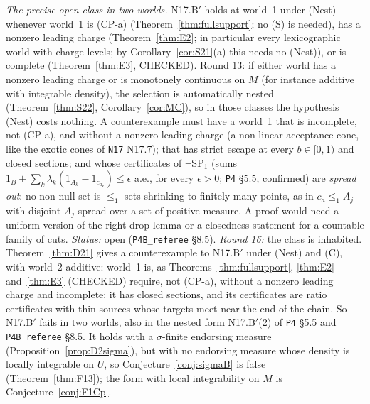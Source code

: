 \documentclass[11pt]{article}
\theoremstyle{definition}
\theoremstyle{remark}
\newcommand{\src}[1]{\texttt{#1}}
\begin{document}
\emph{The precise open class in two worlds.} N17.B$'$ holds at world~1 under (Nest) whenever world~1 is (CP-a) (Theorem~\ref{thm:fullsupport}; no (S) is needed), has a nonzero leading charge (Theorem~\ref{thm:E2}; in particular every lexicographic world with charge levels; by Corollary~\ref{cor:S21}(a) this needs no (Nest)), or is complete (Theorem~\ref{thm:E3}, CHECKED). Round 13: if either world has a nonzero leading charge or is monotonely continuous on $M$ (for instance additive with integrable density), the selection is automatically nested (Theorem~\ref{thm:S22}, Corollary~\ref{cor:MC}), so in those classes the hypothesis (Nest) costs nothing. A counterexample must have a world~1 that is incomplete, not (CP-a), and without a nonzero leading charge (a non-linear acceptance cone, like the exotic cones of \src{N17} N17.7); that has strict escape at every $b\in[0,1)$ and closed sections; and whose certificates of $\neg$SP$_1$ (sums $1_B+\sum_k\lambda_k(1_{A_k}-1_{c_{a_k}})\le\epsilon$ a.e., for every $\epsilon>0$; \src{P4} \S5.5, confirmed) are \emph{spread out}: no non-null set is $\le_1$ sets shrinking to finitely many points, as in $c_a\le_1A_j$ with disjoint $A_j$ spread over a set of positive measure. A proof would need a uniform version of the right-drop lemma or a closedness statement for a countable family of cuts. \emph{Status:} open (\src{P4B\_referee} \S8.5). \emph{Round 16:} the class is inhabited. Theorem~\ref{thm:D21} gives a counterexample to N17.B$'$ under (Nest) and (C), with world~2 additive: world~1 is, as Theorems~\ref{thm:fullsupport}, \ref{thm:E2} and~\ref{thm:E3} (CHECKED) require, not (CP-a), without a nonzero leading charge and incomplete; it has closed sections, and its certificates are ratio certificates with thin sources whose targets meet near the end of the chain. So N17.B$'$ fails in two worlds, also in the nested form N17.B$'$(2) of \src{P4} \S5.5 and \src{P4B\_referee} \S8.5. It holds with a $\sigma$-finite endorsing measure (Proposition~\ref{prop:D2sigma}), but with no endorsing measure whose density is locally integrable on $U$, so Conjecture~\ref{conj:sigmaB} is false (Theorem~\ref{thm:F13}); the form with local integrability on $M$ is Conjecture~\ref{conj:F1Cp}.
\end{document}
